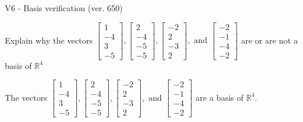 \begin{exercise}
  \begin{exerciseTitle}V6 - Basis verification (ver. 650)\end{exerciseTitle}
  \begin{exerciseStatement}
    Explain why the vectors \(\left[\begin{array}{r}
1 \\
-4 \\
3 \\
-5
\end{array}\right] , \left[\begin{array}{r}
2 \\
-4 \\
-5 \\
-5
\end{array}\right] , \left[\begin{array}{r}
-2 \\
2 \\
-3 \\
2
\end{array}\right] , \text{ and } \left[\begin{array}{r}
-2 \\
-1 \\
-4 \\
-2
\end{array}\right]\) are or are not a basis of \(\mathbb{R}^4\)	


  \end{exerciseStatement}
  \begin{exerciseAnswer}
   The vectors \(\left[\begin{array}{r}
1 \\
-4 \\
3 \\
-5
\end{array}\right] , \left[\begin{array}{r}
2 \\
-4 \\
-5 \\
-5
\end{array}\right] , \left[\begin{array}{r}
-2 \\
2 \\
-3 \\
2
\end{array}\right] , \text{ and } \left[\begin{array}{r}
-2 \\
-1 \\
-4 \\
-2
\end{array}\right]\) 
  	 are  a basis of \(\mathbb{R}^4\).
  


  \end{exerciseAnswer}
\end{exercise}